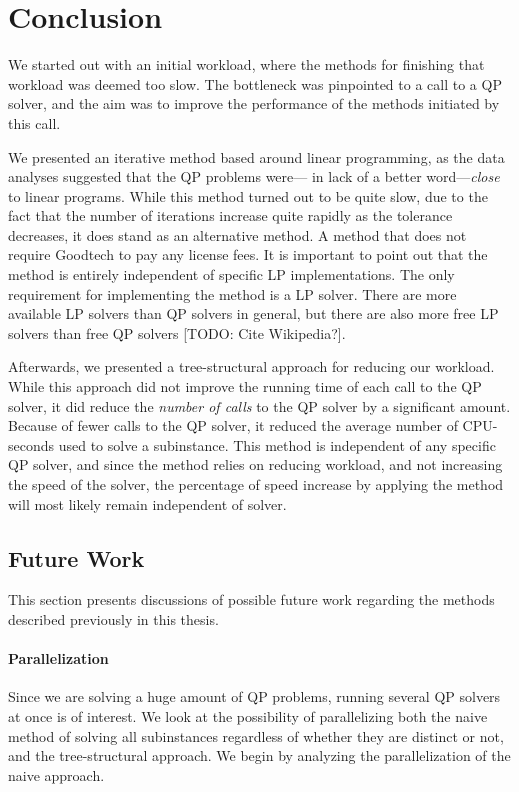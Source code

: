 \documentclass[a4paper,12pt]{report}
\begin{document}
\chapter{Conclusion}
We started out with an initial workload, where the methods for finishing
that workload was deemed too slow. The bottleneck was pinpointed to a call
to a QP solver, and the aim was to improve the performance of the methods
initiated by this call.

We presented an iterative method based around linear programming, as the data
analyses suggested that the QP problems were--- in lack of a better
word---\emph{close} to linear programs. While this method turned out to be
quite slow, due to the fact that the number of iterations increase quite
rapidly as the tolerance decreases, it does stand as an alternative method. A
method that does not require Goodtech to pay any license fees. It is important
to point out that the method is entirely independent of specific LP
implementations. The only requirement for implementing the method is a LP
solver. There are more available LP solvers than QP solvers in general,
but there are also more free LP solvers than free QP solvers [TODO: Cite 
Wikipedia?].

Afterwards, we presented a tree-structural approach for reducing our workload.
While this approach did not improve the running time of each call to the QP
solver, it did reduce the \emph{number of calls} to the QP solver by a
significant amount. Because of fewer calls to the QP solver, it reduced the
average number of CPU-seconds used to solve a subinstance. This method is
independent of any specific QP solver, and since the method relies on reducing
workload, and not increasing the speed of the solver, the percentage of speed
increase by applying the method will most likely remain independent of solver.

\section{Future Work}
This section presents discussions of possible future work regarding the methods
described previously in this thesis.

\subsubsection{Parallelization}
Since we are solving a huge amount of QP problems, running several QP solvers
at once is of interest. We look at the possibility of parallelizing both
the naive method of solving all subinstances regardless of whether they are
distinct or not, and the tree-structural approach. We begin by analyzing
the parallelization of the naive approach.
\end{document}
